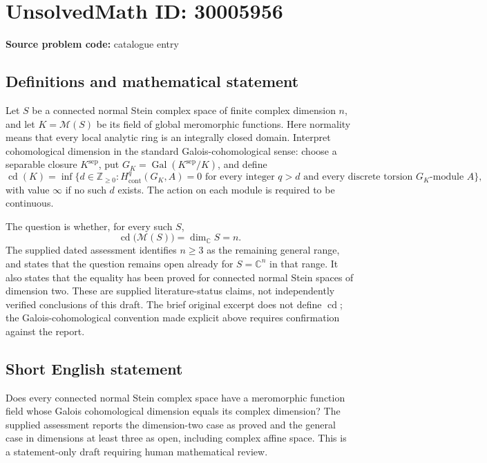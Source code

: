 \documentclass[11pt]{article}
\newcommand{\Z}{\mathbb{Z}}
\newcommand{\C}{\mathbb{C}}
\begin{document}
\section*{UnsolvedMath ID: 30005956}
\textbf{Source problem code:} catalogue entry
\subsection{Definitions and mathematical statement}
Let \(S\) be a connected normal Stein complex space of finite complex dimension \(n\), and let \(K=\mathcal M(S)\) be its field of global meromorphic functions. Here normality means that every local analytic ring is an integrally closed domain. Interpret cohomological dimension in the standard Galois-cohomological sense: choose a separable closure \(K^{\mathrm{sep}}\), put \(G_K=\operatorname{Gal}(K^{\mathrm{sep}}/K)\), and define
\[
\operatorname{cd}(K)=\inf\bigl\{d\in\Z_{\geq 0}: H^q_{\mathrm{cont}}(G_K,A)=0\text{ for every integer }q>d\text{ and every discrete torsion }G_K\text{-module }A\bigr\},
\]
with value \(\infty\) if no such \(d\) exists. The action on each module is required to be continuous.

The question is whether, for every such \(S\),
\[
\operatorname{cd}\bigl(\mathcal M(S)\bigr)=\dim_{\C}S=n.
\]
The supplied dated assessment identifies \(n\geq 3\) as the remaining general range, and states that the question remains open already for \(S=\C^n\) in that range. It also states that the equality has been proved for connected normal Stein spaces of dimension two. These are supplied literature-status claims, not independently verified conclusions of this draft. The brief original excerpt does not define \(\operatorname{cd}\); the Galois-cohomological convention made explicit above requires confirmation against the report.
\subsection{Short English statement}
Does every connected normal Stein complex space have a meromorphic function field whose Galois cohomological dimension equals its complex dimension? The supplied assessment reports the dimension-two case as proved and the general case in dimensions at least three as open, including complex affine space. This is a statement-only draft requiring human mathematical review.
\end{document}
